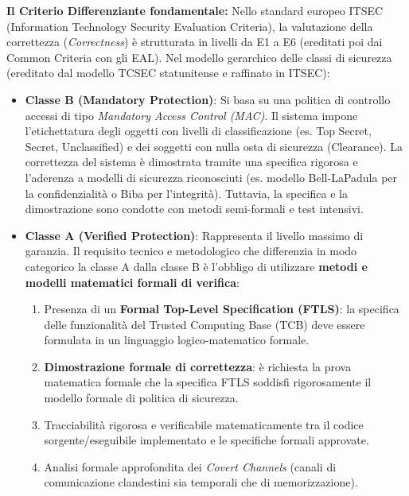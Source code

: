 \documentclass[11pt,a4paper]{article}
\begin{document}
\begin{solutionbox}
\textbf{Il Criterio Differenziante fondamentale:}
Nello standard europeo ITSEC (Information Technology Security Evaluation Criteria), la valutazione della correttezza (\textit{Correctness}) \`e strutturata in livelli da E1 a E6 (ereditati poi dai Common Criteria con gli EAL).
Nel modello gerarchico delle classi di sicurezza (ereditato dal modello TCSEC statunitense e raffinato in ITSEC):
\begin{itemize}
    \item \textbf{Classe B (Mandatory Protection)}: Si basa su una politica di controllo accessi di tipo \textit{Mandatory Access Control (MAC)}. Il sistema impone l'etichettatura degli oggetti con livelli di classificazione (es. Top Secret, Secret, Unclassified) e dei soggetti con nulla osta di sicurezza (Clearance). La correttezza del sistema \`e dimostrata tramite una specifica rigorosa e l'aderenza a modelli di sicurezza riconosciuti (es. modello Bell-LaPadula per la confidenzialit\`a o Biba per l'integrit\`a). Tuttavia, la specifica e la dimostrazione sono condotte con metodi semi-formali e test intensivi.
    \item \textbf{Classe A (Verified Protection)}: Rappresenta il livello massimo di garanzia. Il requisito tecnico e metodologico che differenzia in modo categorico la classe A dalla classe B \`e l'obbligo di utilizzare \textbf{metodi e modelli matematici formali di verifica}:
    \begin{enumerate}
        \item Presenza di un \textbf{Formal Top-Level Specification (FTLS)}: la specifica delle funzionalit\`a del Trusted Computing Base (TCB) deve essere formulata in un linguaggio logico-matematico formale.
        \item \textbf{Dimostrazione formale di correttezza}: \`e richiesta la prova matematica formale che la specifica FTLS soddisfi rigorosamente il modello formale di politica di sicurezza.
        \item Tracciabilit\`a rigorosa e verificabile matematicamente tra il codice sorgente/eseguibile implementato e le specifiche formali approvate.
        \item Analisi formale approfondita dei \textit{Covert Channels} (canali di comunicazione clandestini sia temporali che di memorizzazione).
    \end{enumerate}
\end{itemize}
\end{solutionbox}
\end{document}
